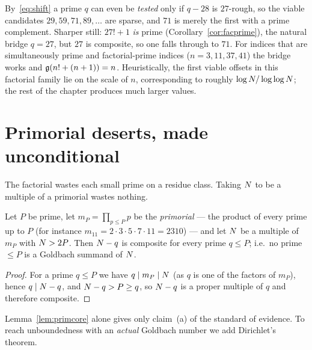 By~\eqref{eq:shift} a prime $q$ can even be \emph{tested} only if $q-28$
is $27$-rough, so the viable candidates $29,59,71,89,\dots$ are sparse,
and $71$ is merely the first with a prime complement. Sharper still:
$27!+1$ \emph{is} prime (Corollary~\ref{cor:facprime}), the natural
bridge $q=27$, but $27$ is composite, so one falls through to $71$. For
indices that are simultaneously prime and factorial-prime indices
($n=3,11,37,41$) the bridge works and $\mathfrak{g}(n!+(n+1))=n$. Heuristically,
the first viable offsets in this factorial family lie on the scale of
$n$, corresponding to roughly $\log N/\log\log N$; the rest of the
chapter produces much larger values.

\section{Primorial deserts, made unconditional}\label{sec:primorial}

The factorial wastes each small prime on a residue class. Taking $N$ to
be a multiple of a primorial wastes nothing.

\begin{lemma}\label{lem:primcore}
Let $P$ be prime, let $m_P=\prod_{p\le P}p$ be the \emph{primorial} ---
the product of every prime up to $P$ (for instance
$m_{11}=2\cdot3\cdot5\cdot7\cdot11=2310$) --- and let $N$ be a multiple
of $m_P$ with $N>2P$. Then $N-q$ is composite for every prime
$q\le P$; i.e.\ no prime $\le P$ is a Goldbach summand of $N$.
\end{lemma}
\begin{proof}
For a prime $q\le P$ we have $q\mid m_P\mid N$ (as $q$ is one of the
factors of $m_P$), hence $q\mid N-q$, and $N-q>P\ge q$, so $N-q$ is a
proper multiple of $q$ and therefore composite.
\end{proof}

Lemma~\ref{lem:primcore} alone gives only claim~(a) of the standard of
evidence. To reach unboundedness with an \emph{actual} Goldbach number
we add Dirichlet's theorem.

